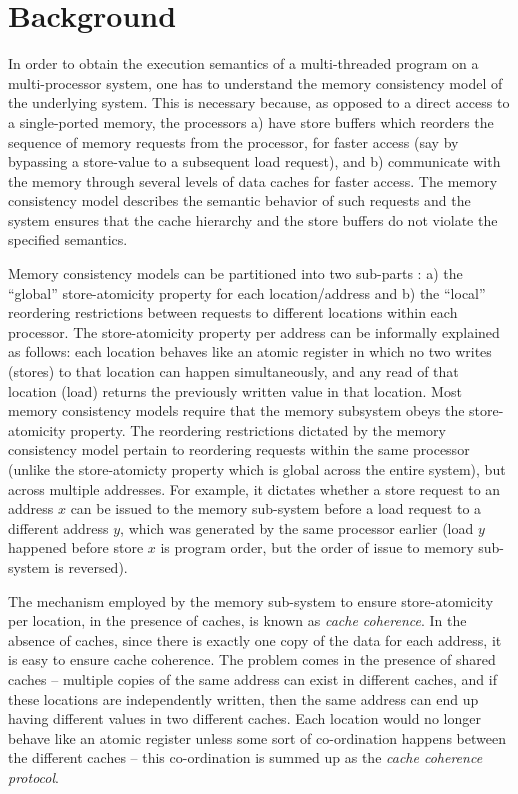 \section{Background}

In order to obtain the execution semantics of a multi-threaded program on a
multi-processor system, one has to understand the memory consistency model of
the underlying system. This is necessary because, as opposed to a direct access
to a single-ported memory, the processors a) have store buffers which reorders
the sequence of memory requests from the processor, for faster access (say by
bypassing a store-value to a subsequent load request), and b) communicate with
the memory through several levels of data caches for faster access. The memory
consistency model describes the semantic behavior of such requests and the
system ensures that the cache hierarchy and the store buffers do not violate
the specified semantics.

Memory consistency models can be partitioned into two sub-parts
\cite{Arvind-memory-model}: a) the ``global'' store-atomicity property for each
location/address and b) the ``local'' reordering restrictions between requests
to different locations within each processor. The store-atomicity property per
address can be informally explained as follows: each location behaves like an
atomic register in which no two writes (stores) to that location can happen
simultaneously, and any read of that location (load) returns the previously
written value in that location. Most memory consistency models require that the
memory subsystem obeys the store-atomicity property. The reordering
restrictions dictated by the memory consistency model pertain to reordering
requests within the same processor (unlike the store-atomicty property which is
global across the entire system), but across multiple addresses. For example,
it dictates whether a store request to an address $x$ can be issued to the
memory sub-system before a load request to a different address $y$, which was
generated by the same processor earlier (\ie load $y$ happened before store $x$
is program order, but the order of issue to memory sub-system is reversed).

The mechanism employed by the memory sub-system to ensure store-atomicity per
location, in the presence of caches, is known as \emph{cache coherence}. In the
absence of caches, since there is exactly one copy of the data for each
address, it is easy to ensure cache coherence. The problem comes in the
presence of shared caches -- multiple copies of the same address can exist in
different caches, and if these locations are independently written, then the
same address can end up having different values in two different caches. Each
location would no longer behave like an atomic register unless some sort of
co-ordination happens between the different caches -- this co-ordination is
summed up as the \emph{cache coherence protocol}.

